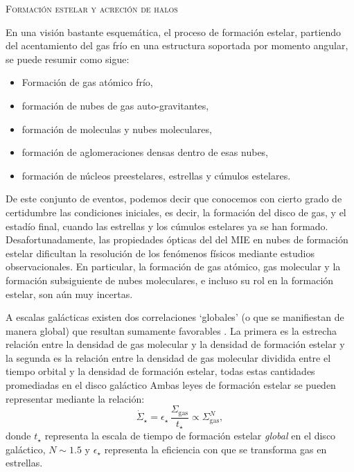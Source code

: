 \documentclass[xcolor=dvipsnames,4pt,hyperref={colorlinks,citecolor=black,linkcolor=black,urlcolor=black}]{beamer}
\begin{document}
\begin{frame}[allowframebreaks]{\textsc{Formación estelar y acreción de halos}}
\begin{description}
En una visión bastante esquemática, el proceso de formación estelar, partiendo del acentamiento del
gas frío en una estructura soportada por momento angular, se puede resumir como sigue:
\begin{itemize}
\item Formación de gas atómico frío,
\item formación de nubes de gas auto-gravitantes,
\item formación de moleculas y nubes moleculares,
\item formación de aglomeraciones densas dentro de esas nubes,
\item formación de núcleos preestelares, estrellas y cúmulos estelares.
\end{itemize}
De este conjunto de eventos, podemos decir que conocemos con cierto grado de certidumbre las
condiciones iniciales, es decir, la formación del disco de gas, y el estadío final, cuando las
estrellas y los cúmulos estelares ya se han formado. Desafortunadamente, las propiedades ópticas del
del MIE en nubes de formación estelar dificultan la resolución de los fenómenos físicos mediante
estudios observacionales. En particular, la formación de gas atómico, gas molecular y la formación
subsiguiente de nubes moleculares, e incluso su rol en la formación estelar, son aún muy incertas.

A escalas galácticas existen dos correlaciones `globales' (o que se manifiestan de manera global)
que resultan sumamente favorables \citep[e.\,g.][]{Schmidt1959, Kennicutt1998, Kennicutt2012}. La
primera es la estrecha relación entre la densidad de gas molecular y la densidad de formación
estelar y la segunda es la relación entre la densidad de gas molecular dividida entre el tiempo
orbital y la densidad de formación estelar, todas estas cantidades promediadas en el disco galáctico
Ambas leyes de formación estelar se pueden representar mediante la relación:
$$
\dot{\Sigma}_\star = \epsilon_\star\,\frac{\Sigma_\text{gas}}{t_\star}\propto\Sigma_\text{gas}^N,
$$
%
donde $t_\star$ representa la escala de tiempo de formación estelar \emph{global} en el disco
galáctico, $N\sim1.5$ y $\epsilon_\star$ representa la eficiencia con que se transforma gas en
estrellas.


\end{description}
\end{frame}
\end{document}
